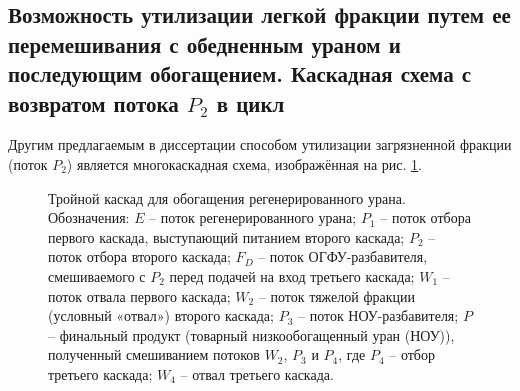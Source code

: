 \subsection{Возможность утилизации легкой фракции путем ее перемешивания с обедненным ураном и последующим обогащением. Каскадная схема с возвратом потока $P_2$ в цикл}\label{triple_c}

Другим предлагаемым в диссертации способом утилизации загрязненной фракции (поток $P_2$) является многокаскадная схема, изображённая на рис. \ref{p2_withDepU}.

\begin{figure}[ht]
    \caption{Тройной каскад для обогащения регенерированного урана. Обозначения: $E$ -- поток регенерированного урана; $P_1$ -- поток отбора первого каскада, выступающий питанием второго каскада; $P_2$ -- поток отбора второго каскада; $F_{D}$ -- поток ОГФУ-разбавителя, смешиваемого с $P_2$ перед подачей на вход третьего каскада; $W_1$ -- поток отвала первого каскада; $W_2$ -- поток тяжелой фракции (условный «отвал») второго каскада; $P_3$ -- поток НОУ-разбавителя; $P$ -- финальный продукт (товарный низкообогащенный уран (НОУ)), полученный смешиванием потоков $W_2$, $P_3$ и $P_4$, где $P_4$ -- отбор третьего каскада; $W_4$ -- отвал третьего каскада.}\label{p2_withDepU}
\end{figure}

